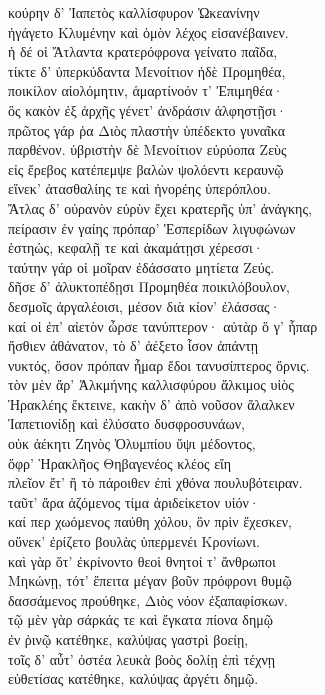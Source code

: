 \begin{pages}
\begin{Leftside}
\quad{}κούρην δ' Ἰαπετὸς καλλίσφυρον Ὠκεανίνην\\
ἠγάγετο Κλυμένην καὶ ὁμὸν λέχος εἰσανέβαινεν.\\
ἡ δέ οἱ Ἄτλαντα κρατερόφρονα γείνατο παῖδα,\\
τίκτε δ' ὑπερκύδαντα Μενοίτιον ἠδὲ Προμηθέα, \\
ποικίλον αἰολόμητιν, ἁμαρτίνοόν τ' Ἐπιμηθέα· \\
ὃς κακὸν ἐξ ἀρχῆς γένετ' ἀνδράσιν ἀλφηστῇσι· \\
πρῶτος γάρ ῥα Διὸς πλαστὴν ὑπέδεκτο γυναῖκα\\
παρθένον. ὑβριστὴν δὲ Μενοίτιον εὐρύοπα Ζεὺς\\
εἰς ἔρεβος κατέπεμψε βαλὼν ψολόεντι κεραυνῷ  \\
εἵνεκ' ἀτασθαλίης τε καὶ ἠνορέης ὑπερόπλου.\\
Ἄτλας δ' οὐρανὸν εὐρὺν ἔχει κρατερῆς ὑπ' ἀνάγκης, \\
πείρασιν ἐν γαίης πρόπαρ' Ἑσπερίδων λιγυφώνων \\
ἑστηώς, κεφαλῇ τε καὶ ἀκαμάτῃσι χέρεσσι· \\
ταύτην γάρ οἱ μοῖραν ἐδάσσατο μητίετα Ζεύς. \\
δῆσε δ' ἀλυκτοπέδῃσι Προμηθέα ποικιλόβουλον,\\
δεσμοῖς ἀργαλέοισι, μέσον διὰ κίον' ἐλάσσας· \\
καί οἱ ἐπ' αἰετὸν ὦρσε τανύπτερον· αὐτὰρ ὅ γ' ἧπαρ \\
ἤσθιεν ἀθάνατον, τὸ δ' ἀέξετο ἶσον ἁπάντῃ \\
νυκτός, ὅσον πρόπαν ἦμαρ ἔδοι τανυσίπτερος ὄρνις.  \\
τὸν μὲν ἄρ' Ἀλκμήνης καλλισφύρου ἄλκιμος υἱὸς\\
Ἡρακλέης ἔκτεινε, κακὴν δ' ἀπὸ νοῦσον ἄλαλκεν\\
Ἰαπετιονίδῃ καὶ ἐλύσατο δυσφροσυνάων, \\
οὐκ ἀέκητι Ζηνὸς Ὀλυμπίου ὕψι μέδοντος,\\
ὄφρ' Ἡρακλῆος Θηβαγενέος κλέος εἴη \\
πλεῖον ἔτ' ἢ τὸ πάροιθεν ἐπὶ χθόνα πουλυβότειραν.\\
ταῦτ' ἄρα ἁζόμενος τίμα ἀριδείκετον υἱόν·\\
καί περ χωόμενος παύθη χόλου, ὃν πρὶν ἔχεσκεν,\\
οὕνεκ' ἐρίζετο βουλὰς ὑπερμενέι Κρονίωνι.\\

\quad{}καὶ γὰρ ὅτ' ἐκρίνοντο θεοὶ θνητοί τ' ἄνθρωποι \\
Μηκώνῃ, τότ' ἔπειτα μέγαν βοῦν πρόφρονι θυμῷ\\
δασσάμενος προύθηκε, Διὸς νόον ἐξαπαφίσκων. \\
τῷ μὲν γὰρ σάρκάς τε καὶ ἔγκατα πίονα δημῷ \\
ἐν ῥινῷ κατέθηκε, καλύψας γαστρὶ βοείῃ,\\
τοῖς δ' αὖτ' ὀστέα λευκὰ βοὸς δολίῃ ἐπὶ τέχνῃ  \\
εὐθετίσας κατέθηκε, καλύψας ἀργέτι δημῷ. \\


\end{Leftside}
\end{pages}
